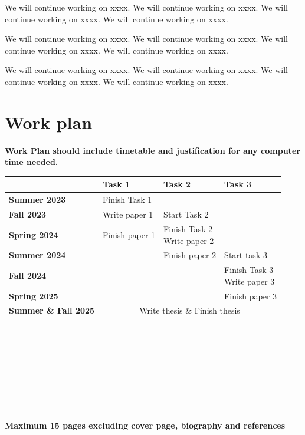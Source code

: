 \documentclass[11pt]{article} %
\begin{document}
We will continue working on xxxx. We will continue working on xxxx. We will continue working on xxxx. We will continue working on xxxx. \par
We will continue working on xxxx. We will continue working on xxxx. We will continue working on xxxx. We will continue working on xxxx. \par
We will continue working on xxxx. We will continue working on xxxx. We will continue working on xxxx. We will continue working on xxxx. \par

\section{Work plan}
\textbf{\color{red} Work Plan should include timetable and justification for any computer time needed.}\\
\begin{tabularx}{\textwidth}{lXXX}
	& \textbf{Task 1} & \textbf{Task 2} & \arraybackslash\textbf{Task 3} \\
	\hline
	\hline
	\textbf{Summer 2023} & Finish Task 1 &  &  \\ 
	\hline
	\textbf{Fall 2023} & Write paper 1 & Start Task 2 &  \\
	\hline
	\textbf{Spring 2024} & Finish paper 1 & \makecell[l]{Finish Task 2 \\ Write paper 2} &  \\
	\hline
	\textbf{Summer 2024} & & Finish paper 2 & Start task 3 \\ 
	\hline
	\textbf{Fall 2024} & & & \makecell[l]{Finish Task 3 \\ Write paper 3}\\
	\hline
	\textbf{Spring 2025} & & & Finish paper 3  \\
	\hline
	\multicolumn{1}{l}{\textbf{Summer \& Fall 2025}} & \multicolumn{3}{c}{Write thesis \& Finish thesis} \\
	\hline
\end{tabularx}
\\
\\
\\
\\
\\
\\
\\
\\
\textbf{\huge \color{red} Maximum 15 pages excluding cover page, biography and references}

\newpage
\end{document}
